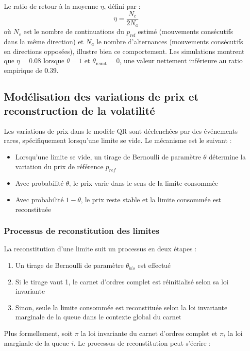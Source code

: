 \documentclass[12pt,a4paper]{article}
\theoremstyle{definition}
\theoremstyle{remark}
\begin{document}
    Le ratio de retour à la moyenne $\eta$, défini par :
    $$\eta = \frac{N_c}{2N_a}$$
    où $N_c$ est le nombre de continuations du $p_{\text{ref}}$ estimé (mouvements consécutifs dans la même direction) et $N_a$ le nombre d'alternances (mouvements consécutifs en directions opposées), illustre bien ce comportement. Les simulations montrent que $\eta = 0.08$ lorsque $\theta = 1$ et $\theta_{\text{reinit}} = 0$, une valeur nettement inférieure au ratio empirique de $0.39$.


\subsection{Modélisation des variations de prix et reconstruction de la volatilité}

Les variations de prix dans le modèle QR sont déclenchées par des événements rares, spécifiquement lorsqu'une limite se vide. Le mécanisme est le suivant :

\begin{itemize}
    \item Lorsqu'une limite se vide, un tirage de Bernoulli de paramètre $\theta$ détermine la variation du prix de référence $p_{ref}$
    \item Avec probabilité $\theta$, le prix varie dans le sens de la limite consommée
    \item Avec probabilité $1-\theta$, le prix reste stable et la limite consommée est reconstituée
\end{itemize}

\subsubsection{Processus de reconstitution des limites}

La reconstitution d'une limite suit un processus en deux étapes :

\begin{enumerate}
    \item Un tirage de Bernoulli de paramètre $\theta_{bis}$ est effectué
    \item Si le tirage vaut 1, le carnet d'ordres complet est réinitialisé selon sa loi invariante
    \item Sinon, seule la limite consommée est reconstituée selon la loi invariante marginale de la queue dans le contexte global du carnet
\end{enumerate}

Plus formellement, soit $\pi$ la loi invariante du carnet d'ordres complet et $\pi_i$ la loi marginale de la queue $i$. Le processus de reconstitution peut s'écrire :
\end{document}

